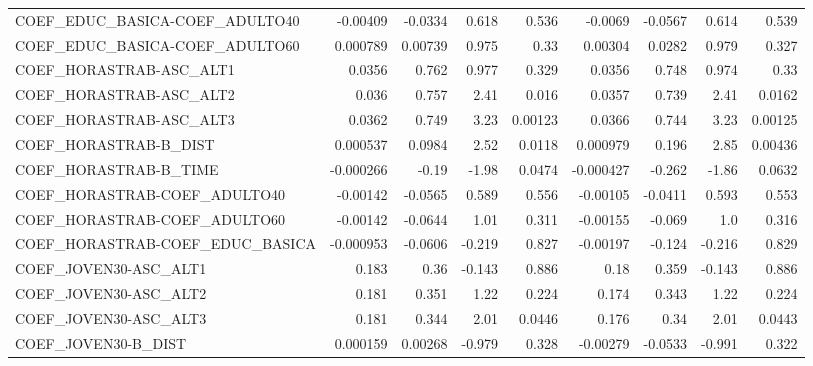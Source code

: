 \begin{tabular}{lrrrrrrrr}
COEF\_EDUC\_BASICA-COEF\_ADULTO40    &    -0.00409 &      -0.0334 &   0.618 &    0.536 &    -0.0069 &     -0.0567 &        0.614 &         0.539 \\
COEF\_EDUC\_BASICA-COEF\_ADULTO60    &    0.000789 &      0.00739 &   0.975 &     0.33 &    0.00304 &      0.0282 &        0.979 &         0.327 \\
COEF\_HORASTRAB-ASC\_ALT1           &      0.0356 &        0.762 &   0.977 &    0.329 &     0.0356 &       0.748 &        0.974 &          0.33 \\
COEF\_HORASTRAB-ASC\_ALT2           &       0.036 &        0.757 &    2.41 &    0.016 &     0.0357 &       0.739 &         2.41 &        0.0162 \\
COEF\_HORASTRAB-ASC\_ALT3           &      0.0362 &        0.749 &    3.23 &  0.00123 &     0.0366 &       0.744 &         3.23 &       0.00125 \\
COEF\_HORASTRAB-B\_DIST             &    0.000537 &       0.0984 &    2.52 &   0.0118 &   0.000979 &       0.196 &         2.85 &       0.00436 \\
COEF\_HORASTRAB-B\_TIME             &   -0.000266 &        -0.19 &   -1.98 &   0.0474 &  -0.000427 &      -0.262 &        -1.86 &        0.0632 \\
COEF\_HORASTRAB-COEF\_ADULTO40      &    -0.00142 &      -0.0565 &   0.589 &    0.556 &   -0.00105 &     -0.0411 &        0.593 &         0.553 \\
COEF\_HORASTRAB-COEF\_ADULTO60      &    -0.00142 &      -0.0644 &    1.01 &    0.311 &   -0.00155 &      -0.069 &          1.0 &         0.316 \\
COEF\_HORASTRAB-COEF\_EDUC\_BASICA   &   -0.000953 &      -0.0606 &  -0.219 &    0.827 &   -0.00197 &      -0.124 &       -0.216 &         0.829 \\
COEF\_JOVEN30-ASC\_ALT1             &       0.183 &         0.36 &  -0.143 &    0.886 &       0.18 &       0.359 &       -0.143 &         0.886 \\
COEF\_JOVEN30-ASC\_ALT2             &       0.181 &        0.351 &    1.22 &    0.224 &      0.174 &       0.343 &         1.22 &         0.224 \\
COEF\_JOVEN30-ASC\_ALT3             &       0.181 &        0.344 &    2.01 &   0.0446 &      0.176 &        0.34 &         2.01 &        0.0443 \\
COEF\_JOVEN30-B\_DIST               &    0.000159 &      0.00268 &  -0.979 &    0.328 &   -0.00279 &     -0.0533 &       -0.991 &         0.322 \\

\end{tabular}

